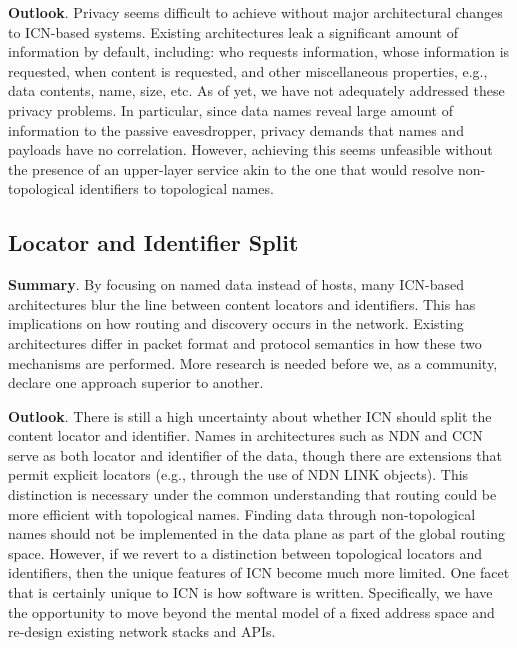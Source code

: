 {\bf Outlook}. Privacy seems difficult to achieve without major architectural changes to
ICN-based systems. Existing architectures leak a significant amount of information by default,
including: who requests information, whose information is requested, when content
is requested, and other miscellaneous properties, e.g., data contents, name, size,
etc. As of yet, we have not adequately addressed these privacy problems.
In particular, since data names reveal large amount of information to
the passive eavesdropper, privacy demands that names and payloads have no correlation.
However, achieving this seems unfeasible without the presence of an upper-layer service
akin to the one that would resolve non-topological identifiers to topological names.\\

\subsection{Locator and Identifier Split}
{\bf Summary}. By focusing on named data instead of hosts, many ICN-based architectures
blur the line between content locators and identifiers. This has implications on how
routing and discovery occurs in the network. Existing architectures differ in packet format
and protocol semantics in how these two mechanisms are performed. More research is
needed before we, as a community, declare one approach superior to another.

{\bf Outlook}. There is still a high uncertainty about whether ICN should split the content
locator and identifier. Names in architectures such as NDN and CCN serve as both
locator and identifier of the data, though there are extensions that permit explicit locators
(e.g., through the use of NDN LINK objects). This distinction is necessary under the common understanding that
routing could be more efficient with topological names. Finding
data through non-topological names should not be implemented in the data plane as part of the global
routing space. However, if we revert to a distinction between topological locators and
identifiers, then the unique features of ICN become much more limited.
One facet that is certainly unique to ICN is how software is written. Specifically, we
have the opportunity to move beyond the mental model of a fixed address space and re-design
existing network stacks and APIs.

